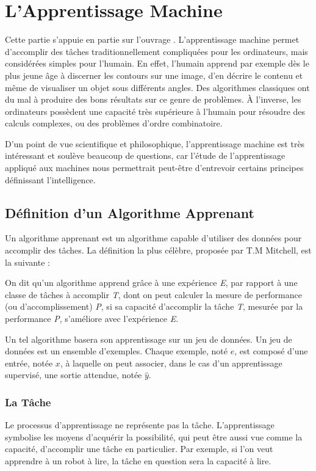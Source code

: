 \documentclass[a4paper, 11pt]{report}
\begin{document}
\chapter{L'Apprentissage Machine}
Cette partie s'appuie en partie sur l'ouvrage \citep{Goodfellow2016}.
L'apprentissage machine permet d'accomplir des tâches traditionnellement compliquées pour les ordinateurs, mais considérées simples pour l'humain.
En effet, l'humain apprend par exemple dès le plus jeune âge à discerner les contours sur une image, d'en décrire le contenu et même de visualiser un objet sous différents angles. Des algorithmes classiques ont du mal à produire des bons résultats sur ce genre de problèmes.
À l'inverse, les ordinateurs possèdent une capacité très supérieure à l'humain pour résoudre des calculs complexes, ou des problèmes d'ordre combinatoire.

D'un point de vue scientifique et philosophique, l'apprentissage machine est très intéressant et soulève beaucoup de questions, car l'étude de l'apprentissage appliqué aux machines nous permettrait peut-être d'entrevoir certains principes définissant l'intelligence.
\section{Définition d'un Algorithme Apprenant}
Un algorithme apprenant est un algorithme capable d'utiliser des données pour accomplir des tâches. La définition la plus célèbre, proposée par T.M Mitchell, est la suivante :
\begin{displayquote}
	On dit qu'un algorithme apprend grâce à une expérience \emph{E}, par rapport à une classe de tâches à accomplir \emph{T}, dont on peut calculer la mesure de performance (ou d'accomplissement) \emph{P}, si sa capacité d'accomplir la tâche \emph{T}, mesurée par la performance \emph{P}, s'améliore avec l'expérience \emph{E}.
\end{displayquote}

Un tel algorithme basera son apprentissage sur un jeu de données. Un jeu de données est un ensemble d'exemples.
Chaque exemple, noté $e$, est composé d'une entrée, notée $x$, à laquelle on peut associer, dans le cas d'un apprentissage supervisé, une sortie attendue, notée $\hat{y}$.
\subsection{La Tâche}
Le processus d'apprentissage ne représente pas la tâche. L'apprentissage symbolise les moyens d'acquérir la possibilité, qui peut être aussi vue comme la capacité, d'accomplir une tâche en particulier.
Par exemple, si l'on veut apprendre à un robot à lire, la tâche en question sera la capacité à lire.
\end{document}
